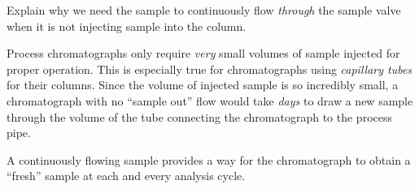 Explain why we need the sample to continuously flow {\it through} the sample valve when it is not injecting sample into the column.







Process chromatographs only require {\it very} small volumes of sample injected for proper operation.  This is especially true for chromatographs using {\it capillary tubes} for their columns.  Since the volume of injected sample is so incredibly small, a chromatograph with no ``sample out'' flow would take {\it days} to draw a new sample through the volume of the tube connecting the chromatograph to the process pipe.

A continuously flowing sample provides a way for the chromatograph to obtain a ``fresh'' sample at each and every analysis cycle.











